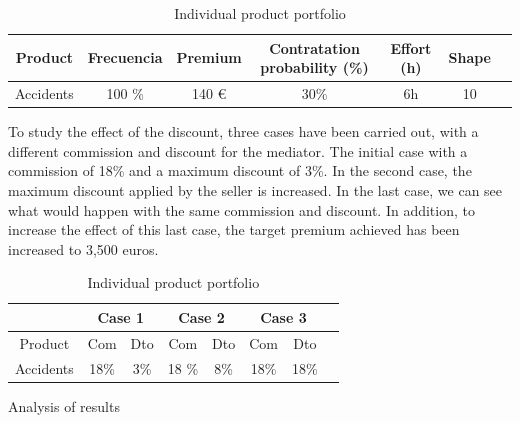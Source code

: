 \documentclass[review]{elsarticle}
\begin{document}
\begin{table}[htb]
\centering
\caption{Individual product portfolio}
\label{tab:port}
\begin{tabular}{c c c c c c c}
        \hline
        \hline
        Product & Frecuencia & Premium & Contratation probability (\%) & Effort (h) & Shape  \\
        \hline
        Accidents & 100 \% & 140 € & 30\% & 6h & 10 \\
        \hline
\end{tabular}
\end{table}

To study the effect of the discount, three cases have been carried out, with a different commission and discount for the mediator.
The initial case with a commission of 18\% and a maximum discount of 3\%. In the second case, the maximum discount applied by the seller is increased. In the last case, we can see what would happen with the same commission and discount. In addition, to increase the effect of this last case, the target premium achieved has been increased to 3,500 euros.

\begin{table}[htb]
\centering
\caption{Individual product portfolio}
\label{tab:port2}
\begin{tabular}{c c c c c c c c}
        \hline
        \hline
         & \multicolumn{2}{c}{Case 1}& \multicolumn{2}{c}{Case 2} & \multicolumn{2}{c}{Case 3}\\
        \hline
        Product & Com & Dto & Com & Dto & Com & Dto \\
        \hline
        Accidents & 18\% & 3\% & 18 \% & 8\% & 18\% & 18\% \\
        \hline
\end{tabular}
\end{table}

Analysis of results
\end{document}

